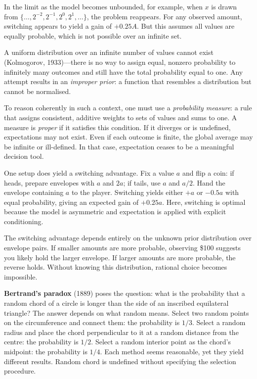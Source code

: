 In the limit as the model becomes unbounded, for example, when \( x \) is drawn from \( \{\dots, 2^{-2}, 2^{-1}, 2^0, 2^1, \dots\} \), the problem reappears. For any observed amount, switching appears to yield a gain of \( +0.25A \). But this assumes all values are equally probable, which is not possible over an infinite set.

A uniform distribution over an infinite number of values cannot exist (Kolmogorov, 1933)—there is no way to assign equal, nonzero probability to infinitely many outcomes and still have the total probability equal to one. Any attempt results in an \emph{improper prior}: a function that resembles a distribution but cannot be normalised.

To reason coherently in such a context, one must use a \emph{probability measure}: a rule that assigns consistent, additive weights to sets of values and sums to one. A measure is \emph{proper} if it satisfies this condition. If it diverges or is undefined, expectations may not exist. Even if each outcome is finite, the global average may be infinite or ill-defined. In that case, expectation ceases to be a meaningful decision tool.

One setup does yield a switching advantage. Fix a value \( a \) and flip a coin: if heads, prepare envelopes with \( a \) and \( 2a \); if tails, use \( a \) and \( a/2 \). Hand the envelope containing \( a \) to the player. Switching yields either \( +a \) or \( -0.5a \) with equal probability, giving an expected gain of \( +0.25a \). Here, switching is optimal because the model is asymmetric and expectation is applied with explicit conditioning.

The switching advantage depends entirely on the unknown prior distribution over envelope pairs. If smaller amounts are more probable, observing \$100 suggests you likely hold the larger envelope. If larger amounts are more probable, the reverse holds. Without knowing this distribution, rational choice becomes impossible.

\textbf{Bertrand's paradox} (1889) poses the question: what is the probability that a random chord of a circle is longer than the side of an inscribed equilateral triangle? The answer depends on what \QSOpen{}random\QSClose{} means. Select two random points on the circumference and connect them: the probability is $1/3$. Select a random radius and place the chord perpendicular to it at a random distance from the centre: the probability is $1/2$. Select a random interior point as the chord's midpoint: the probability is $1/4$. Each method seems reasonable, yet they yield different results. \QSOpen{}Random chord\QSClose{} is undefined without specifying the selection procedure.

